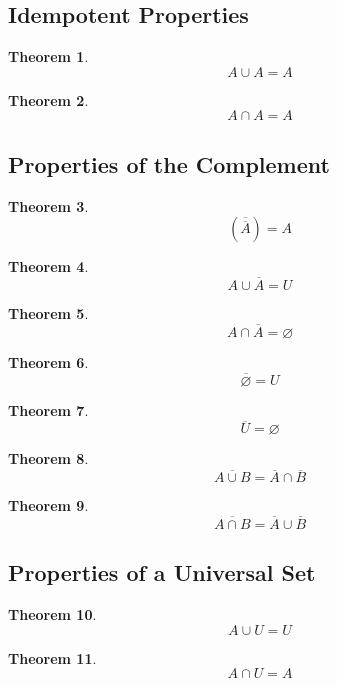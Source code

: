 \documentclass{article}  %
\newtheorem{theorem}{Theorem}[section]
\theoremstyle{definition}
\begin{document}
\subsection{Idempotent Properties}
\begin{theorem}
    \[
        A \cup A = A
    \]
\end{theorem}
\begin{theorem}
    \[
        A \cap A = A
    \]
\end{theorem}

\subsection{Properties of the Complement}
\begin{theorem}
    \[
        (\overline{\overline{A}}) = A
    \]
\end{theorem}
\begin{theorem}
    \[
        A \cup {\overline{A}} = U
    \]
\end{theorem}
\begin{theorem}
    \[
        A \cap {\overline{A}} = \varnothing
    \]
\end{theorem}
\begin{theorem}
    \[
        \overline{\varnothing} = U
    \]
\end{theorem}

\begin{theorem}
    \[
        \overline{U} = \varnothing
    \]
\end{theorem}

\begin{theorem}
    \[
        \overline{A \cup B} = \overline{A} \cap \overline{B}
    \]
\end{theorem}

\begin{theorem}
    \[
        \overline{A \cap B} = \overline{A} \cup \overline{B}
    \]
\end{theorem}


\subsection{Properties of a Universal Set}

\begin{theorem}
    \[
        A \cup U = U
    \]
\end{theorem}


\begin{theorem}
    \[
        A \cap U = A
    \]
\end{theorem}
\end{document}
